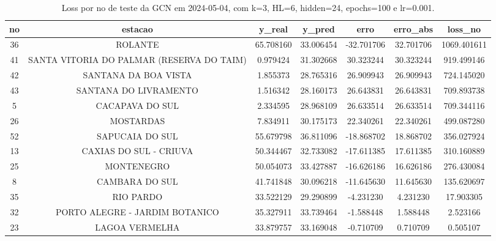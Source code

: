 \begin{table}[h]
\centering
\caption{Loss por no de teste da GCN em 2024-05-04, com k=3, HL=6, hidden=24, epochs=100 e lr=0.001.}
\label{tab:gcn_loss_k3_hl6_h24_e100_d20240504}
\begin{tabular}{ccccccc}
\toprule
no & estacao & y\_real & y\_pred & erro & erro\_abs & loss\_no \\
\midrule
36 & ROLANTE & 65.708160 & 33.006454 & -32.701706 & 32.701706 & 1069.401611 \\
41 & SANTA VITORIA DO PALMAR (RESERVA DO TAIM) & 0.979424 & 31.302668 & 30.323244 & 30.323244 & 919.499146 \\
42 & SANTANA DA BOA VISTA & 1.855373 & 28.765316 & 26.909943 & 26.909943 & 724.145020 \\
43 & SANTANA DO LIVRAMENTO & 1.516342 & 28.160173 & 26.643831 & 26.643831 & 709.893738 \\
5 & CACAPAVA DO SUL & 2.334595 & 28.968109 & 26.633514 & 26.633514 & 709.344116 \\
26 & MOSTARDAS & 7.834911 & 30.175173 & 22.340261 & 22.340261 & 499.087280 \\
52 & SAPUCAIA DO SUL & 55.679798 & 36.811096 & -18.868702 & 18.868702 & 356.027924 \\
13 & CAXIAS DO SUL - CRIUVA & 50.344467 & 32.733082 & -17.611385 & 17.611385 & 310.160889 \\
25 & MONTENEGRO & 50.054073 & 33.427887 & -16.626186 & 16.626186 & 276.430084 \\
8 & CAMBARA DO SUL & 41.741848 & 30.096218 & -11.645630 & 11.645630 & 135.620697 \\
35 & RIO PARDO & 33.522129 & 29.290899 & -4.231230 & 4.231230 & 17.903305 \\
32 & PORTO ALEGRE - JARDIM BOTANICO & 35.327911 & 33.739464 & -1.588448 & 1.588448 & 2.523166 \\
23 & LAGOA VERMELHA & 33.879757 & 33.169048 & -0.710709 & 0.710709 & 0.505107 \\
\bottomrule
\end{tabular}
\end{table}
